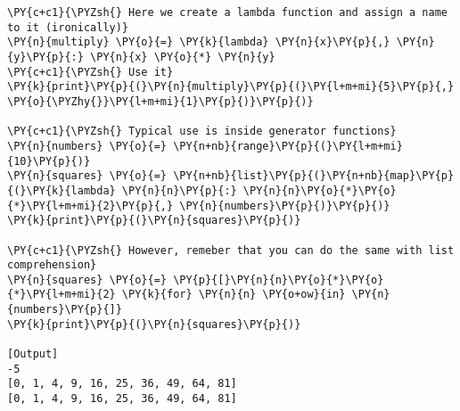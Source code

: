 \begin{Verbatim}[label=\makebox{\url{https://github.com/lucabaldini/cmepda/tree/master/slides/latex/snippets/lambda.py}},commandchars=\\\{\}]
\PY{c+c1}{\PYZsh{} Here we create a lambda function and assign a name to it (ironically)}
\PY{n}{multiply} \PY{o}{=} \PY{k}{lambda} \PY{n}{x}\PY{p}{,} \PY{n}{y}\PY{p}{:} \PY{n}{x} \PY{o}{*} \PY{n}{y}
\PY{c+c1}{\PYZsh{} Use it}
\PY{k}{print}\PY{p}{(}\PY{n}{multiply}\PY{p}{(}\PY{l+m+mi}{5}\PY{p}{,} \PY{o}{\PYZhy{}}\PY{l+m+mi}{1}\PY{p}{)}\PY{p}{)}

\PY{c+c1}{\PYZsh{} Typical use is inside generator functions}
\PY{n}{numbers} \PY{o}{=} \PY{n+nb}{range}\PY{p}{(}\PY{l+m+mi}{10}\PY{p}{)}
\PY{n}{squares} \PY{o}{=} \PY{n+nb}{list}\PY{p}{(}\PY{n+nb}{map}\PY{p}{(}\PY{k}{lambda} \PY{n}{n}\PY{p}{:} \PY{n}{n}\PY{o}{*}\PY{o}{*}\PY{l+m+mi}{2}\PY{p}{,} \PY{n}{numbers}\PY{p}{)}\PY{p}{)}
\PY{k}{print}\PY{p}{(}\PY{n}{squares}\PY{p}{)}

\PY{c+c1}{\PYZsh{} However, remeber that you can do the same with list comprehension}
\PY{n}{squares} \PY{o}{=} \PY{p}{[}\PY{n}{n}\PY{o}{*}\PY{o}{*}\PY{l+m+mi}{2} \PY{k}{for} \PY{n}{n} \PY{o+ow}{in} \PY{n}{numbers}\PY{p}{]}
\PY{k}{print}\PY{p}{(}\PY{n}{squares}\PY{p}{)}

[Output]
-5
[0, 1, 4, 9, 16, 25, 36, 49, 64, 81]
[0, 1, 4, 9, 16, 25, 36, 49, 64, 81]
\end{Verbatim}